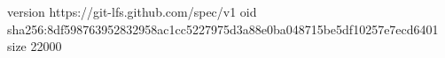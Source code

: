 version https://git-lfs.github.com/spec/v1
oid sha256:8df598763952832958ac1cc5227975d3a88e0ba048715be5df10257e7ecd6401
size 22000
